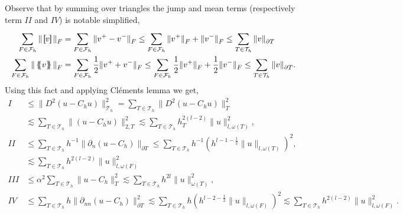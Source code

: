 Observe that by summing over triangles the jump and mean terms (respectively term $II$ and
$IV$) is notable simplified, \[
    \begin{split}
\sum_{F \in \mathcal{F}_{h} }^{}  \| \jump{ v }   \|_{F  }^{  } & =\sum_{F \in \mathcal{F}_{h} }^{}  \|  v^{+} - v^{-}    \|_{F  }^{  } \le \sum_{F \in \mathcal{F}_{h} }^{} \| v^{+} \|_{  F}^{  }  + \| v^{-} \|_{F }^{  } \le \sum_{T \in
\mathcal{T}_{h} }^{} \| v \|_{ \partial T }^{  } \\
\sum_{F \in \mathcal{F}_{h} }^{}  \| \mean{ v }   \|_{F  }^{  } & =\sum_{F \in \mathcal{F}_{h} }^{} \frac{1}{2} \|  v^{+} + v^{-}    \|_{F  }^{  } \le \sum_{F \in \mathcal{F}_{h} }^{} \frac{1}{2} \| v^{+} \|_{  F}^{  }  +\frac{1}{2} \| v^{-} \|_{F }^{  } \le \sum_{T \in
\mathcal{T}_{h} }^{} \| v \|_{ \partial T }^{  }. \\
    \end{split}
\]
Using this fact and applying Cléments lemma we get,
\begin{equation*}
    \begin{split}
I & \le  \| D^2\left( u - C_{h}u \right)  \|_{ \mathcal{T} _{h} }^{ 2 } = \sum_{T \in \mathcal{T} _{h}}^{} \| D^2 \left( u - C_{h}u \right)  \|_{ T }^{ 2 } \\
 & \lesssim \sum_{T \in \mathcal{T} _{h}}^{}  \| \left( u - C_{h}u \right)  \|_{2,T  }^{  2} \lesssim  \sum_{T \in \mathcal{T} _{h}}^{}  h_{T}^{2\left( l-2 \right) } \| u \|_{l, \omega \left( T \right)   }^{2  }, \\
    II & \le  \sum_{T \in \mathcal{T} _{h}}^{}  h^{-1} \| \partial _{n} \left( u - C_{h} \right)  \|_{ \partial T  }^{  } \le  \sum_{T \in \mathcal{T} _{h}}^{}  h^{-1} \left( h^{l -1 -\frac{1}{2}} \| u \|_{ l, \omega \left( T \right)  }^{  }
    \right)^{2},  \\
    & \lesssim \sum_{T \in \mathcal{T} _{h}}^{}  h^{2(l-2)} \| u \|_{ l, \omega \left( F \right)  }^{ 2 } \\
 III  &\le   \alpha^2  \sum_{T \in \mathcal{T} _{h}}^{}  \| u - C_{h} \|_{ T }^{ 2 } \lesssim   \sum_{T \in \mathcal{T} _{h}}^{} h^{2l} \| u \|_{ \omega \left( T \right)  }^{ 2 }, \\
IV & \le \sum_{T \in \mathcal{T} _{h}}^{}  h \| \partial _{nn} \left( u - C_{h} \right)  \|_{\partial T  }^{2  } \lesssim  \sum_{T \in  \mathcal{T} _{h}}^{} h \left( h^{l -2 -\frac{1}{2}} \| u \|_{ l, \omega \left( F \right)  }^{  }  \right)^{2}
\lesssim
\sum_{T  \in  \mathcal{T} _{h}}^{} h^{2(l-2)}  \| u \|_{ l, \omega \left( F \right)  }^{ 2 }.
 \end{split}
\end{equation*}
